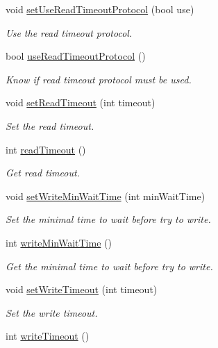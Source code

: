 \begin{DoxyCompactItemize}
void \hyperlink{classmdt_port_config_a5e7857a56ab2baff4bd0a77290b3c742}{setUseReadTimeoutProtocol} (bool use)
\begin{DoxyCompactList}\small\item\em Use the read timeout protocol. \end{DoxyCompactList}\item 
bool \hyperlink{classmdt_port_config_ae2516b9a714f69e3ebb8f2b47d459b50}{useReadTimeoutProtocol} ()
\begin{DoxyCompactList}\small\item\em Know if read timeout protocol must be used. \end{DoxyCompactList}\item 
void \hyperlink{classmdt_port_config_a1028f6c9d7073a6591fa59fc907f0585}{setReadTimeout} (int timeout)
\begin{DoxyCompactList}\small\item\em Set the read timeout. \end{DoxyCompactList}\item 
int \hyperlink{classmdt_port_config_a51b06a66765d072f1d07251351477957}{readTimeout} ()
\begin{DoxyCompactList}\small\item\em Get read timeout. \end{DoxyCompactList}\item 
void \hyperlink{classmdt_port_config_a1d7515af56919b95f060cad4f83c6ef3}{setWriteMinWaitTime} (int minWaitTime)
\begin{DoxyCompactList}\small\item\em Set the minimal time to wait before try to write. \end{DoxyCompactList}\item 
int \hyperlink{classmdt_port_config_a448f69f4c78c51a8d52ff39c31ceb1d5}{writeMinWaitTime} ()
\begin{DoxyCompactList}\small\item\em Get the minimal time to wait before try to write. \end{DoxyCompactList}\item 
void \hyperlink{classmdt_port_config_ac117f7cd1f23de163a7fe84f69c2164c}{setWriteTimeout} (int timeout)
\begin{DoxyCompactList}\small\item\em Set the write timeout. \end{DoxyCompactList}\item 
int \hyperlink{classmdt_port_config_ab0c39fdce3e564f7308d869f4e28cb1c}{writeTimeout} ()

\end{DoxyCompactItemize}
